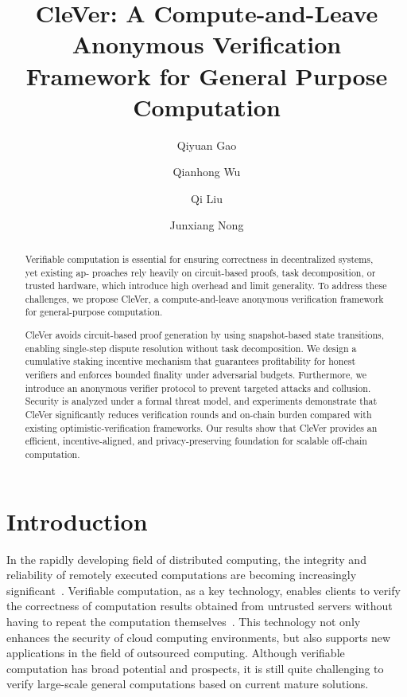 \documentclass[3p]{elsarticle}
\theoremstyle{remark}
\begin{document}
\begin{frontmatter}
\title{
CleVer: A Compute-and-Leave Anonymous Verification Framework for General Purpose Computation
}

\author[bh]{Qiyuan Gao}

\author[bh]{Qianhong Wu}

\author[bh]{Qi Liu}

\author[bh]{Junxiang Nong}


\address[bh]{Beihang University, Beijing, China}
\begin{abstract}
Verifiable computation is essential for ensuring correctness in decentralized systems, yet existing ap- proaches rely heavily on circuit-based proofs, task decomposition, or trusted hardware, which introduce high overhead and limit generality. To address these challenges, we propose CleVer, a compute-and-leave anonymous verification framework for general-purpose computation. 

CleVer avoids circuit-based proof generation by using snapshot-based state transitions, enabling single-step dispute resolution without task decomposition. We design a cumulative staking incentive mechanism that guarantees profitability for honest verifiers and enforces bounded finality under adversarial budgets. Furthermore, we introduce an anonymous verifier protocol to prevent targeted attacks and collusion. Security is analyzed under a formal threat model, and experiments demonstrate that CleVer significantly reduces verification rounds and on-chain burden compared with existing optimistic-verification frameworks. Our results show that CleVer provides an efficient, incentive-aligned, and privacy-preserving foundation for scalable off-chain computation.
\end{abstract}

\end{frontmatter}




\section{Introduction}

In the rapidly developing field of distributed computing, the integrity and reliability of remotely executed computations are becoming increasingly significant~\cite{surveyofcloud, CEE-security}. Verifiable computation, as a key technology, enables clients to verify the correctness of computation results obtained from untrusted servers without having to repeat the computation themselves~\cite{blkvc-review,vc-survey,v3rified}. This technology not only enhances the security of cloud computing environments, but also supports new applications in the field of outsourced computing. Although verifiable computation has broad potential and prospects, it is still quite challenging to verify large-scale general computations based on current mature solutions.
\end{document}
